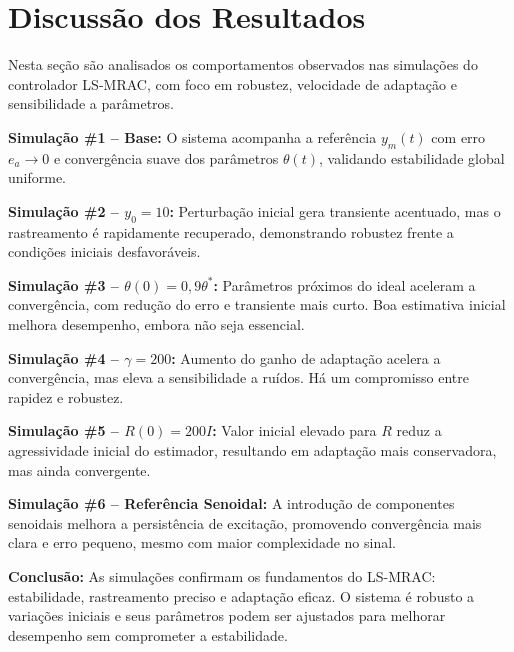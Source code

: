 \documentclass[10pt]{article}
\begin{document}
\newpage

\section{Discussão dos Resultados}

Nesta seção são analisados os comportamentos observados nas simulações do controlador LS-MRAC, com foco em robustez, velocidade de adaptação e sensibilidade a parâmetros.

\textbf{Simulação \#1 – Base:} O sistema acompanha a referência $y_m(t)$ com erro $e_a \rightarrow 0$ e convergência suave dos parâmetros $\theta(t)$, validando estabilidade global uniforme.

\textbf{Simulação \#2 – $y_0 = 10$:} Perturbação inicial gera transiente acentuado, mas o rastreamento é rapidamente recuperado, demonstrando robustez frente a condições iniciais desfavoráveis.

\textbf{Simulação \#3 – $\theta(0) = 0{,}9\theta^*$:} Parâmetros próximos do ideal aceleram a convergência, com redução do erro e transiente mais curto. Boa estimativa inicial melhora desempenho, embora não seja essencial.

\textbf{Simulação \#4 – $\gamma = 200$:} Aumento do ganho de adaptação acelera a convergência, mas eleva a sensibilidade a ruídos. Há um compromisso entre rapidez e robustez.

\textbf{Simulação \#5 – $R(0) = 200I$:} Valor inicial elevado para $R$ reduz a agressividade inicial do estimador, resultando em adaptação mais conservadora, mas ainda convergente.

\textbf{Simulação \#6 – Referência Senoidal:} A introdução de componentes senoidais melhora a persistência de excitação, promovendo convergência mais clara e erro pequeno, mesmo com maior complexidade no sinal.

\vspace{0.5em}
\textbf{Conclusão:} As simulações confirmam os fundamentos do LS-MRAC: estabilidade, rastreamento preciso e adaptação eficaz. O sistema é robusto a variações iniciais e seus parâmetros podem ser ajustados para melhorar desempenho sem comprometer a estabilidade.
\end{document}
